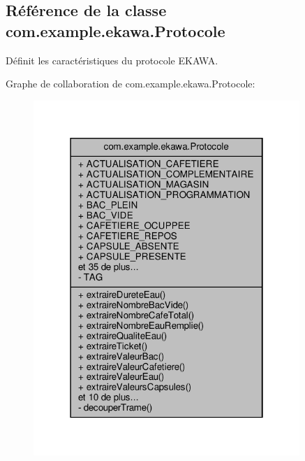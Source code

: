 \hypertarget{classcom_1_1example_1_1ekawa_1_1_protocole}{}\subsection{Référence de la classe com.\+example.\+ekawa.\+Protocole}
\label{classcom_1_1example_1_1ekawa_1_1_protocole}


Définit les caractéristiques du protocole E\+K\+A\+WA.  




Graphe de collaboration de com.\+example.\+ekawa.\+Protocole\+:\nopagebreak
\begin{figure}[H]
\begin{center}
\leavevmode
\includegraphics[width=286pt]{classcom_1_1example_1_1ekawa_1_1_protocole__coll__graph}
\end{center}
\end{figure}
